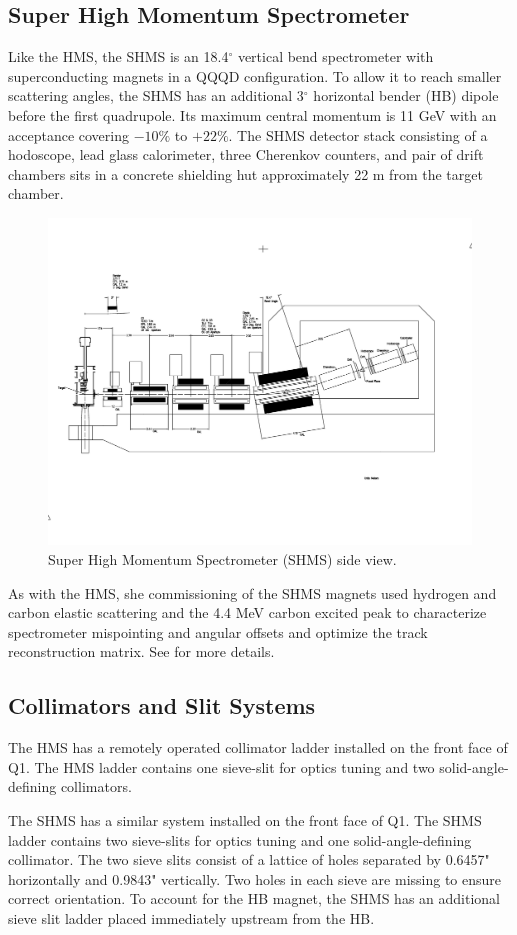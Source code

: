 \subsection{Super High Momentum Spectrometer}
Like the HMS, the SHMS is an 18.4$^{\circ}$ vertical bend spectrometer with
superconducting magnets in a QQQD configuration.
To allow it to reach smaller scattering angles, the SHMS has an additional
3$^{\circ}$ horizontal bender (HB) dipole before the first quadrupole.
Its maximum central momentum is 11 GeV with an acceptance covering $-10\%$
to $+22\%$.
The SHMS detector stack consisting of a hodoscope, lead glass calorimeter,
three Cherenkov counters, and pair of drift chambers sits in a concrete
shielding hut approximately 22 m from the target chamber.

\begin{figure}[!h]
    \centering
    \includegraphics[width=1.0\textwidth]{chap3/SHMS_Layout_new.pdf}
    \caption{Super High Momentum Spectrometer (SHMS) side view.}
    \label{fig:hms_schematic}
\end{figure}

As with the HMS, she commissioning of the SHMS magnets used hydrogen and carbon
elastic scattering and the 4.4 MeV carbon excited peak to characterize
spectrometer mispointing and angular offsets and optimize the track
reconstruction matrix.
See \cite{Holly_SHMS_Optics} for more details.

\subsection{Collimators and Slit Systems}
The HMS has a remotely operated collimator ladder installed on the front face
of Q1.
The HMS ladder contains one sieve-slit for optics tuning and two
solid-angle-defining collimators.

The SHMS has a similar system installed on the front face of Q1.
The SHMS ladder contains two sieve-slits for optics tuning and one
solid-angle-defining collimator.
The two sieve slits consist of a lattice of holes separated by 0.6457"
horizontally and 0.9843" vertically.
Two holes in each sieve are missing to ensure correct orientation.
To account for the HB magnet, the SHMS has an additional sieve slit ladder
placed immediately upstream from the HB.
